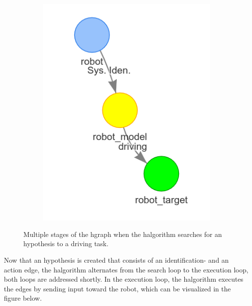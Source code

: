 \begin{figure}[h]
\begin{subfigure}{.3\textwidth}
    \end{subfigure}
    \begin{subfigure}{.3\textwidth}
    \centering
    \includegraphics[width=\textwidth]{figures/proposed_method/connecting_nodes/robot_to_target/robot_iden_drive_target}
    \end{subfigure}
    \caption{Multiple stages of the \ac{hgraph} when the \ac{halgorithm} searches for an hypothesis to a driving task.}%
    \label{fig:robot_drive_hgraph}
\end{figure}

Now that an hypothesis is created that consists of an identification- and an action edge, the \ac{halgorithm} alternates from the search loop to the execution loop, both loops are addressed shortly. In the execution loop, the \ac{halgorithm} executes the edges by sending input toward the robot, which can be visualized in the figure below.\bs

